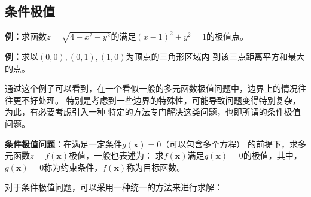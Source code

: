 \subsection{条件极值}

{\bf 例：}求函数$z=\sqrt{4-x^2-y^2}$的满足$(x-1)^2+y^2=1$的极值点。

\begin{center}
\end{center}

{\bf 例：}求以$(0,0),(0,1),(1,0)$为顶点的三角形区域内
到该三点距离平方和最大的点。

通过这个例子可以看到，在一个看似一般的多元函数极值问题中，边界上的情况往往更不好处理。
特别是考虑到一些边界的特殊性，可能导致问题变得特别复杂，为此，有必要考虑引入一种
特定的方法专门解决这类问题，也即所谓的{\kaishu 条件极值问题}。

\begin{thx}
	{\bf 条件极值问题}：在满足一定条件$g(\bm{x})=0$（可以包含多个方程）
	的前提下，求多元函数$z=f(\bm{x})$极值，一般也表述为：
	{\kaishu 求$f(\bm{x})$满足$g(\bm{x})=0$的极值}，其中，
	$g(\bm{x})=0$称为{\kaishu 约束条件}，$f(\bm{x})$称为{\kaishu 目标函数}。
\end{thx}

对于条件极值问题，可以采用一种统一的方法来进行求解：

